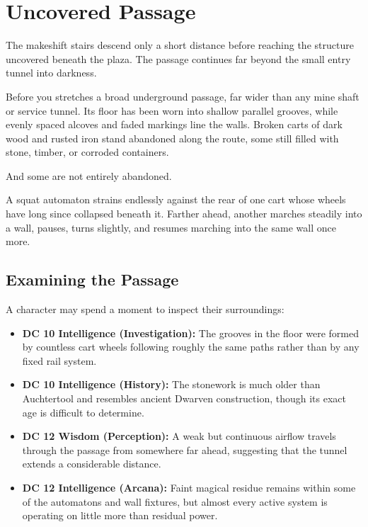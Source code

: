 \section*{ Uncovered Passage}
{\entryfont The makeshift stairs descend only a short distance before reaching the structure uncovered beneath the plaza. The passage continues far beyond the small entry tunnel into darkness.}
\begin{DndReadAloud}
	Before you stretches a broad underground passage, far wider than any mine shaft or service tunnel. Its floor has been worn into shallow parallel grooves, while evenly spaced alcoves and faded markings line the walls. Broken carts of dark wood and rusted iron stand abandoned along the route, some still filled with stone, timber, or corroded containers.

	And some are not entirely abandoned.

	A squat automaton strains endlessly against the rear of one cart whose wheels have long since collapsed beneath it. Farther ahead, another marches steadily into a wall, pauses, turns slightly, and resumes marching into the same wall once more.
\end{DndReadAloud}
\subsection*{Examining the Passage}
{\entryfont A character may spend a moment to inspect their surroundings:
\begin{itemize}[label={\textbf{\textbullet}}]
	\item \textbf{DC 10 Intelligence (Investigation):} The grooves in the floor were formed by countless cart wheels following roughly the same paths rather than by any fixed rail system.
	\item \textbf{DC 10 Intelligence (History):} The stonework is much older than Auchtertool and resembles ancient Dwarven construction, though its exact age is difficult to determine.
	\item \textbf{DC 12 Wisdom (Perception):} A weak but continuous airflow travels through the passage from somewhere far ahead, suggesting that the tunnel extends a considerable distance.
	\item \textbf{DC 12 Intelligence (Arcana):} Faint magical residue remains within some of the automatons and wall fixtures, but almost every active system is operating on little more than residual power.
\end{itemize}}